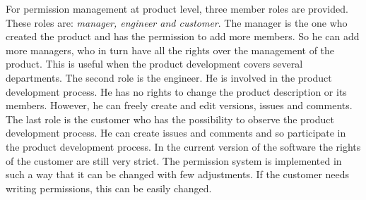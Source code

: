 For permission management at product level, three member roles are provided. These roles are: \textit{manager, engineer and customer}. The manager is the one who created the product and has the permission to add more members. So he can add more managers, who in turn have all the rights over the management of the product. This is useful when the product development covers several departments. The second role is the engineer. He is involved in the product development process. He has no rights to change the product description or its members. However, he can freely create and edit versions, issues and comments. The last role is the customer who has the possibility to observe the product development process. He can create issues and comments and so participate in the product development process. In the current version of the software the rights of the customer are still very strict. The permission system is implemented in such a way that it can be changed with few adjustments. If the customer needs writing permissions, this can be easily changed.